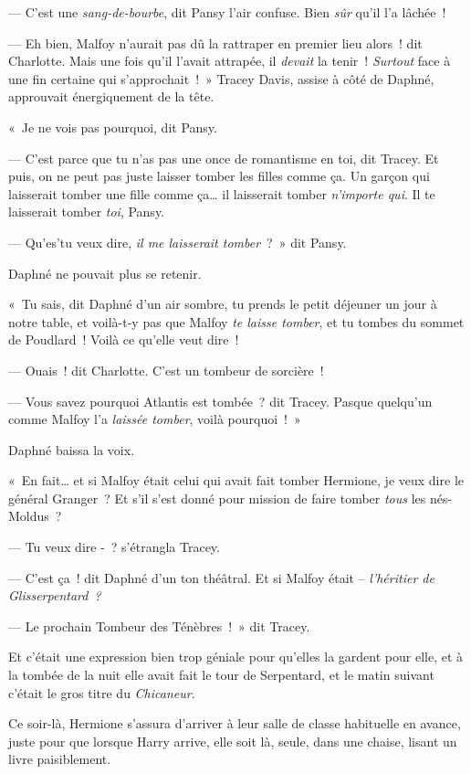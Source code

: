 --- C'est une \emph{sang-de-bourbe}, dit Pansy l'air confuse.
Bien \emph{sûr} qu'il l'a lâchée~!

--- Eh bien, Malfoy n'aurait pas dû la rattraper en premier lieu alors~! dit Charlotte.
Mais une fois qu'il l'avait attrapée, il \emph{devait} la tenir~!
\emph{Surtout} face à une fin certaine qui s'approchait~!~»
Tracey Davis, assise à côté de Daphné, approuvait énergiquement de la tête.

«~Je ne vois pas pourquoi, dit Pansy.

--- C'est parce que tu n'as pas une once de romantisme en toi, dit Tracey.
Et puis, on ne peut pas juste laisser tomber les filles comme ça.
Un garçon qui laisserait tomber une fille comme ça… il laisserait tomber \emph{n'importe qui}.
Il te laisserait tomber \emph{toi}, Pansy.

--- Qu'es'tu veux dire, \emph{il me laisserait tomber}~?~»
dit Pansy.

Daphné ne pouvait plus se retenir.

«~Tu sais, dit Daphné d'un air sombre, tu prends le petit déjeuner un jour à notre table, et voilà-t-y pas que Malfoy \emph{te laisse tomber}, et tu tombes du sommet de Poudlard~!
Voilà ce qu'elle veut dire~!

--- Ouais~! dit Charlotte.
C'est un tombeur de sorcière~!

--- Vous savez pourquoi Atlantis est tombée~? dit Tracey.
Pasque quelqu'un comme Malfoy l'a \emph{laissée tomber}, voilà pourquoi~!~»

Daphné baissa la voix.

«~En fait… et si Malfoy était celui qui avait fait tomber Hermione, je veux dire le général Granger~?
Et s'il s'est donné pour mission de faire tomber \emph{tous} les nés-Moldus~?

--- Tu veux dire -~? s'étrangla Tracey.

--- C'est ça~! dit Daphné d'un ton théâtral.
Et si Malfoy était -- \emph{l'héritier de Glisserpentard~?}

--- Le prochain Tombeur des Ténèbres~!~»
dit Tracey.

Et c'était une expression bien trop géniale pour qu'elles la gardent pour elle, et à la tombée de la nuit elle avait fait le tour de Serpentard, et le matin suivant c'était le gros titre du \emph{Chicaneur}.


Ce soir-là, Hermione s'assura d'arriver à leur salle de classe habituelle en avance, juste pour que lorsque Harry arrive, elle soit là, seule, dans une chaise, lisant un livre paisiblement.

